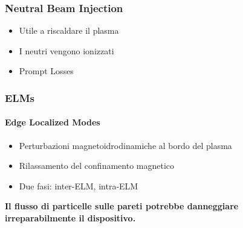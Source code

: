 \begin{frame}
\frametitle{Neutral Beam Injection}
\begin{center}
\begin{itemize}
	\item Utile a riscaldare il plasma
	\item I neutri vengono ionizzati
	\item Prompt Losses
\end{itemize}
\end{center}
\end{frame}

\begin{frame}
\frametitle{ELMs}
\framesubtitle{Edge Localized Modes}
\begin{center}
\begin{itemize}
	\item Perturbazioni magnetoidrodinamiche al bordo del plasma
	\item Rilassamento del confinamento magnetico
	\item Due fasi: inter-ELM, intra-ELM
\end{itemize}
\end{center}
{\bfseries Il flusso di particelle sulle pareti potrebbe danneggiare irreparabilmente il dispositivo.}
\end{frame}




